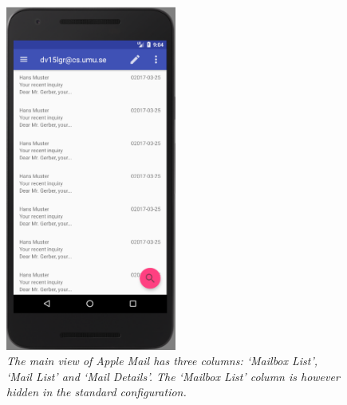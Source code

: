 \documentclass[a4paper,11pt,twoside]{article}
\begin{document}
\begin{figure}
  \label{fig:mail_message_list}
  \centering
    \includegraphics[width=0.5\textwidth]{mail_message_list}
    \caption{\textit{The main view of Apple Mail has three columns: `Mailbox List',
    `Mail List' and `Mail Details'. The `Mailbox List' column is however
    hidden in the standard configuration.}}
\end{figure}
\end{document}
